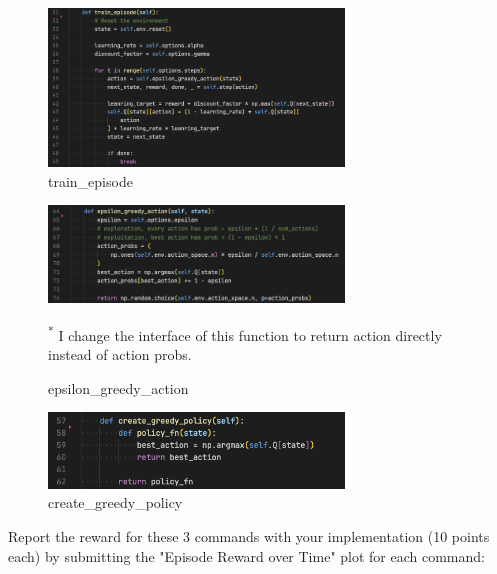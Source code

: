 \documentclass[a4paper]{article}
\theoremstyle{definition}
\newenvironment{soln}{
    \leavevmode\color{blue}\ignorespaces
}{}
\begin{document}
\begin{soln}
	\begin{figure}[H]
		\centering
		\includegraphics[width=0.7\textwidth]{img/ql_train_episode.png}
		\caption*{train\_episode}
	\end{figure}
	\begin{figure}[H]
		\centering
		\includegraphics[width=0.7\textwidth]{img/ql_epsilon_greedy_action.png}
		\caption*{epsilon\_greedy\_action}
		\small\textsuperscript{*} I change the interface of this function to return action directly instead of action probs.
	\end{figure}
	\begin{figure}[H]
		\centering
		\includegraphics[width=0.7\textwidth]{img/ql_create_greedy_policy.png}
		\caption*{create\_greedy\_policy}
	\end{figure}
\end{soln}

Report the reward for these 3 commands with your implementation (10 points each) by submitting the "Episode Reward over Time" plot for each command:
\end{document}
